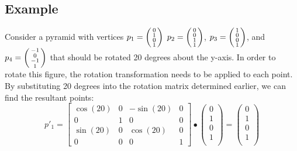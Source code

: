 \documentclass{article}
\begin{document}
	\subsection{Example}
	Consider a pyramid with vertices
	\(p_{1} = \begin{psmallmatrix} 0 \\ 1 \\ 0 \\ 1 \\ \end{psmallmatrix}\)
	\(p_{2} = \begin{psmallmatrix} 0 \\ 0 \\ 1 \\ 1 \\ \end{psmallmatrix}\),
	\(p_{3} = \begin{psmallmatrix} 1 \\ 0 \\ 0 \\ 1 \\ \end{psmallmatrix}\), and
	\(p_{4} = \begin{psmallmatrix} -1 \\ 0 \\ -1 \\ 1 \\ \end{psmallmatrix}\)
	that should be rotated 20 degrees about the y-axis. 
	In order to rotate this figure, the rotation transformation needs to be applied to each point. By substituting 20 degrees into the rotation matrix determined earlier, we can find the resultant points:
	\[
		p'_{1} =
		\begin{bmatrix}
			\cos(20) & 0 & -\sin(20) & 0 \\
			0 & 1 & 0 & 0 \\
			\sin(20) & 0 &  \cos(20) & 0 \\
			0 & 0 & 0 & 1
		\end{bmatrix}
		\bullet
		\begin{pmatrix}
			0 \\ 1 \\ 0 \\ 1 \\
		\end{pmatrix}
		=
		\begin{pmatrix}
			0 \\ 1 \\ 0 \\ 1 \\
		\end{pmatrix}
	\]
\end{document}
